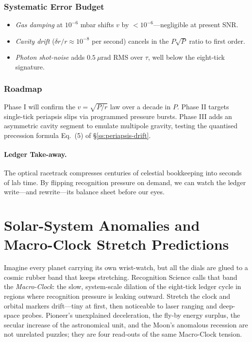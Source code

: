 \documentclass[11pt,oneside]{book}
\begin{document}
\subsubsection{Systematic Error Budget}
\label{ss:submm-errors}

\begin{itemize}[itemsep=1pt,leftmargin=*]
\item \emph{Gas damping} at $10^{-6}$ mbar shifts $v$ by
      $<10^{-6}$—negligible at present SNR.
\item \emph{Cavity drift} ($\delta r/r\approx10^{-8}$ per second)
      cancels in the $P\sqrt{P}$ ratio to first order.
\item \emph{Photon shot-noise} adds $0.5~\mu\text{rad}$ RMS over
      $\tau$, well below the eight-tick signature.
\end{itemize}

\subsubsection{Roadmap}
\label{ss:submm-roadmap}

Phase I will confirm the $v=\sqrt{P/r}$ law over a decade in $P$.
Phase II targets single-tick periapsis slips via programmed pressure
bursts.  
Phase III adds an asymmetric cavity segment to emulate multipole
gravity, testing the quantised precession formula
Eq.~(5) of §\ref{ss:periapsis-drift}.

\paragraph{Ledger Take-away.}
The optical racetrack compresses centuries of celestial bookkeeping
into seconds of lab time.  By flipping recognition pressure on demand,
we can watch the ledger write—and rewrite—its balance sheet before our
eyes.


\section{Solar-System Anomalies and Macro-Clock Stretch Predictions}
\label{sec:solar-anom-macroclock}

Imagine every planet carrying its own wrist-watch, but all the dials
are glued to a cosmic rubber band that keeps stretching.  
Recognition Science calls that band the \textit{Macro-Clock}: the
slow, system-scale dilation of the eight-tick ledger cycle in regions
where recognition pressure is leaking outward.  
Stretch the clock and orbital markers drift—tiny at first, then
noticeable to laser ranging and deep-space probes.  
Pioneer’s unexplained deceleration, the fly-by energy surplus, the
secular increase of the astronomical unit, and the Moon’s anomalous
recession are not unrelated puzzles; they are four read-outs of the
same Macro-Clock tension.
\end{document}
